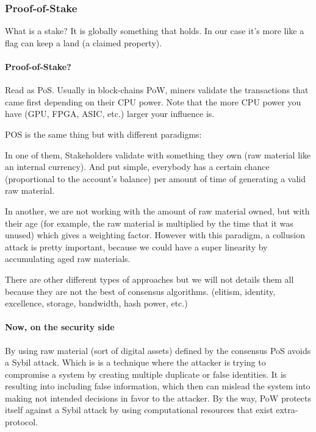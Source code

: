\subsubsection{Proof-of-Stake}
What is a stake? It is globally something that holds. In our case it's more like a flag can keep a land (a claimed property).

\paragraph{Proof-of-Stake?\cite{King2012PPCoin:Proof-of-Stake}}
Read as PoS. Usually in block-chains PoW, miners validate the transactions that came first depending on their CPU power. Note that the more CPU power you have (GPU, FPGA, ASIC, etc.) larger your influence is.

POS is the same thing but with different paradigms:

In one of them, Stakeholders validate with something they own (raw material like an internal currency). And put simple, everybody has a certain chance (proportional to the account’s balance) per amount of time of generating a valid raw material.

In another, we are not working with the amount of raw material owned, but with their age (for example, the raw material is multiplied by the time that it was unused) which gives a weighting factor. However with this paradigm, a collusion attack is pretty important, because we could have a super linearity by accumulating aged raw materials.

There are other different types of approaches but we will not details them all because they are not the best of consensus algorithms. (elitism, identity, excellence, storage, bandwidth, hash power, etc.)

\paragraph{Now, on the security side} By using raw material (sort of digital assets) defined by the consensus PoS avoids a Sybil\cite{G.LawrencePaulSundararaj1D.R.AnitaSofiaLiz22014Anti-SybilNetworks} attack. Which is is a technique where the attacker is trying to compromise a system by creating multiple duplicate or false identities. It is resulting into including false information, which then can mislead the system into making not intended decisions in favor to the attacker. By the way, PoW protects itself against a Sybil attack by using computational resources that exist extra-protocol.

